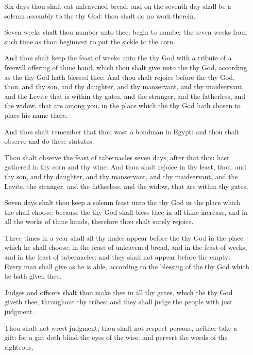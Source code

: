 \verse Six days thou shalt eat unleavened bread: and on the seventh day shall be a solemn assembly to the \LORD thy God: thou shalt do no work therein.

\verse Seven weeks shalt thou number unto thee: begin to number the seven weeks from such time as thou beginnest to put the sickle to the corn.

\verse And thou shalt keep the feast of weeks unto the \LORD thy God with a tribute of a freewill offering of thine hand, which thou shalt give unto the \LORD thy God, according as the \LORD thy God hath blessed thee: \verse And thou shalt rejoice before the \LORD thy God, thou, and thy son, and thy daughter, and thy manservant, and thy maidservant, and the Levite that is within thy gates, and the stranger, and the fatherless, and the widow, that are among you, in the place which the \LORD thy God hath chosen to place his name there.

\verse And thou shalt remember that thou wast a bondman in Egypt: and thou shalt observe and do these statutes.

\verse Thou shalt observe the feast of tabernacles seven days, after that thou hast gathered in thy corn and thy wine: \verse And thou shalt rejoice in thy feast, thou, and thy son, and thy daughter, and thy manservant, and thy maidservant, and the Levite, the stranger, and the fatherless, and the widow, that are within thy gates.

\verse Seven days shalt thou keep a solemn feast unto the \LORD thy God in the place which the \LORD shall choose: because the \LORD thy God shall bless thee in all thine increase, and in all the works of thine hands, therefore thou shalt surely rejoice.

\verse Three times in a year shall all thy males appear before the \LORD thy God in the place which he shall choose; in the feast of unleavened bread, and in the feast of weeks, and in the feast of tabernacles: and they shall not appear before the \LORD empty: \verse Every man shall give as he is able, according to the blessing of the \LORD thy God which he hath given thee.

\verse Judges and officers shalt thou make thee in all thy gates, which the \LORD thy God giveth thee, throughout thy tribes: and they shall judge the people with just judgment.

\verse Thou shalt not wrest judgment; thou shalt not respect persons, neither take a gift: for a gift doth blind the eyes of the wise, and pervert the words of the righteous.

